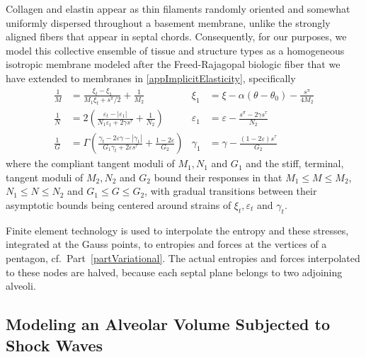 Collagen and elastin appear as thin filaments randomly oriented and somewhat uniformly dispersed throughout a basement membrane, unlike the strongly aligned fibers that appear in septal chords.  Consequently, for our purposes, we model this collective ensemble of tissue and structure types as a homo\-geneous isotropic membrane modeled after the Freed-Rajagopal biologic fiber \cite{FreedRajagopal16} that we have extended to membranes in \ref{appImplicitElasticity}, specifically
\begin{subequations}
    \label{septalCompliances}
    \begin{align}
    \frac{1}{M} & = \frac{\xi_t - \xi_1}{M_1 \xi_t + s^{\pi} / 2} + \frac{1}{M_2} &
    \xi_1 & = \xi - \alpha ( \theta - \theta_0 ) - \frac{s^{\pi}}{4M_2}
    \label{septalDilationCompliance} \\
    \frac{1}{N} & = 2 \left( \frac{ \varepsilon_t - | \varepsilon_1 |}{N_1 \varepsilon_t + 2 \gamma s^{\tau}} + \frac{1}{N_2} \right) & 
    \varepsilon_1 & = \varepsilon - \frac{s^{\sigma} - 2 \gamma s^{\tau}}{N_2}
    \label{septalSqueezeCompliance} \\
    \frac{1}{G} & = \Gamma \left( \frac{\gamma_t - 2\varepsilon \gamma - | \gamma_1 |}{G_1 \gamma_t + 2 \varepsilon s^{\tau}} + \frac{1-2\varepsilon}{G_2} \right) & 
    \gamma_1 & = \gamma - \frac{(1 - 2\varepsilon) s^{\tau}}{G_2}
    \label{septalShearCompliance}
    \end{align}
\end{subequations}
where the compliant tangent moduli of $M_1, N_1$ and $G_1$ and the stiff, terminal, tangent moduli of $M_2 , N_2$ and $G_2$ bound their responses in that $M_1 \leq M \leq M_2$, $N_1 \leq N \leq N_2$ and $G_1 \leq G \leq G_2$, with gradual transitions between their asymptotic bounds being centered around strains of $\xi_t , \varepsilon_t$ and $\gamma_t$.

Finite element technology is used to interpolate the entropy and these stresses, integrated at the Gauss points, to entropies and forces at the vertices of a pentagon, cf.\ Part~\ref{partVariational}.  The actual entropies and forces interpolated to these nodes are halved, because each septal plane belongs to two adjoining alveoli. 

\subsection{Modeling an Alveolar Volume Subjected to Shock Waves}
\label{sec:IdealGasLaw}

